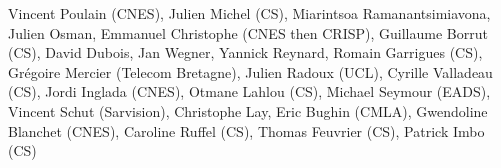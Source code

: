 Vincent Poulain (CNES), Julien Michel (CS), Miarintsoa Ramanantsimiavona, Julien Osman, Emmanuel Christophe (CNES then CRISP), Guillaume Borrut (CS), David Dubois, Jan Wegner, Yannick Reynard, Romain Garrigues (CS), Gr\'egoire Mercier (Telecom Bretagne), Julien Radoux (UCL), Cyrille Valladeau (CS), Jordi Inglada (CNES), Otmane Lahlou (CS), Michael Seymour (EADS), Vincent Schut (Sarvision), Christophe Lay, Eric Bughin (CMLA), Gwendoline Blanchet (CNES), Caroline Ruffel (CS), Thomas Feuvrier (CS), Patrick Imbo (CS)